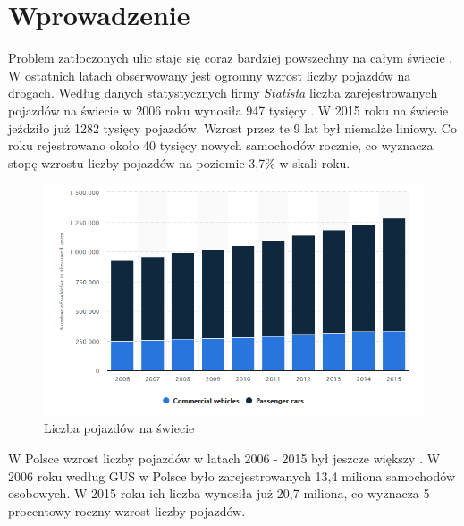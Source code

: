 \documentclass[12pt]{book}
\theoremstyle{plain}
\begin{document}
\chapter{Wprowadzenie}
Problem zatłoczonych ulic staje się coraz bardziej powszechny na całym świecie \cite{mobility_raport2019_col}. W ostatnich latach obserwowany jest ogromny wzrost liczby pojazdów na drogach.
Według danych statystycznych firmy \textit{Statista} liczba zarejestrowanych pojazdów na świecie w 2006 roku wynosiła 947 tysięcy \cite{liczbaPojazdowSwiat}. W 2015 roku na świecie jeździło już 1282 tysięcy pojazdów. Wzrost przez te 9 lat był niemalże liniowy. Co roku rejestrowano około 40 tysięcy nowych samochodów rocznie, co wyznacza stopę wzrostu liczby pojazdów na poziomie 3,7$\%$ w skali roku.
\begin{figure}[H]
  \centering
    \includegraphics[width=14cm]{liczbaPojazdowSwiat}
 \caption{Liczba pojazdów na świecie}
 \label{fig:liczbaPojazdowSwiat}
\end{figure} \noindent
W Polsce wzrost liczby pojazdów w latach 2006 - 2015 był jeszcze większy \cite{liczbaPojazdowPolska}. W 2006 roku według GUS w Polsce było zarejestrowanych 13,4 miliona samochodów osobowych. W 2015 roku ich liczba wynosiła już 20,7 miliona, co wyznacza 5 procentowy roczny wzrost liczby pojazdów.
\end{document}
